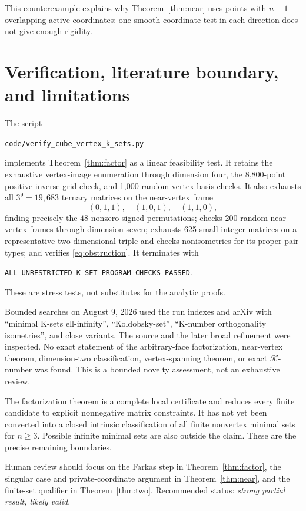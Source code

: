 \documentclass[11pt]{article}
\theoremstyle{definition}
\theoremstyle{remark}
\newcommand{\K}{\mathcal K}
\begin{document}
This counterexample explains why Theorem~\ref{thm:near} uses points with
$n-1$ overlapping active coordinates: one smooth coordinate test in each
direction does not give enough rigidity.

\section{Verification, literature boundary, and limitations}

The script
\begin{center}
\texttt{code/verify\_cube\_vertex\_k\_sets.py}
\end{center}
implements Theorem~\ref{thm:factor} as a linear feasibility test.  It
retains the exhaustive vertex-image enumeration through dimension four,
the 8,800-point positive-inverse grid check, and 1,000 random vertex-basis
checks.  It also exhausts all $3^9=19{,}683$ ternary matrices on the
near-vertex frame
\[
 (0,1,1),\quad(1,0,1),\quad(1,1,0),
\]
finding precisely the $48$ nonzero signed permutations; checks 200 random
near-vertex frames through dimension seven; exhausts 625 small integer
matrices on a representative two-dimensional triple and checks
nonisometries for its proper pair types; and verifies
\eqref{eq:obstruction}.  It terminates with
\begin{center}
\texttt{ALL UNRESTRICTED K-SET PROGRAM CHECKS PASSED}.
\end{center}
These are stress tests, not substitutes for the analytic proofs.

Bounded searches on August 9, 2026 used the run indexes and arXiv with
``minimal K-sets ell-infinity'', ``Koldobsky-set'', ``K-number orthogonality
isometries'', and close variants.  The source \cite{SMP} and the later broad
refinement \cite{MMPS} were inspected.  No exact statement of the
arbitrary-face factorization, near-vertex theorem, dimension-two
classification, vertex-spanning theorem, or exact $\K$-number was found.
This is a bounded novelty assessment, not an exhaustive review.

The factorization theorem is a complete local certificate and reduces every
finite candidate to explicit nonnegative matrix constraints.  It has not yet
been converted into a closed intrinsic classification of all finite
nonvertex minimal sets for $n\geq3$.  Possible infinite minimal sets are also
outside the claim.  These are the precise remaining boundaries.

Human review should focus on the Farkas step in
Theorem~\ref{thm:factor}, the singular case and private-coordinate argument
in Theorem~\ref{thm:near}, and the finite-set qualifier in
Theorem~\ref{thm:two}.  Recommended status: \emph{strong partial result,
likely valid}.
\end{document}
